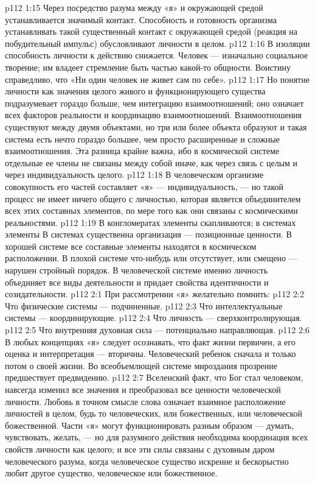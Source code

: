 \vs p112 1:15 Через посредство разума между «я» и окружающей средой устанавливается значимый контакт. Способность и готовность организма устанавливать такой существенный контакт с окружающей средой (реакция на побудительный импульс) обусловливают  личности в целом.
\vs p112 1:16 В изоляции способность личности к действию снижается. Человек --- изначально социальное творение; им владеет стремление быть частью какой\hyp{}то общности. Воистину справедливо, что «Ни один человек не живет сам по себе».
\vs p112 1:17 Но понятие личности как значения целого живого и функционирующего существа подразумевает гораздо больше, чем интеграцию взаимоотношений; оно означает  всех факторов реальности и координацию взаимоотношений. Взаимоотношения существуют между двумя объектами, но три или более объекта образуют  и такая система есть нечто гораздо большее, чем просто расширенные и сложные взаимоотношения. Эта разница крайне важна, ибо в космической системе отдельные ее члены не связаны между собой иначе, как через связь с целым и через индивидуальность целого.
\vs p112 1:18 В человеческом организме совокупность его частей составляет «я» --- индивидуальность, --- но такой процесс не имеет ничего общего с личностью, которая является объединителем всех этих составных элементов, по мере того как они связаны с космическими реальностями.
\vs p112 1:19 В конгломератах элементы скапливаются; в системах элементы  В системах существенна организация --- позиционные ценности. В хорошей системе все составные элементы находятся в космическом расположении. В плохой системе что\hyp{}нибудь или отсутствует, или смещено --- нарушен стройный порядок. В человеческой системе именно личность объединяет все виды деятельности и придает свойства идентичности и созидательности.
\vs p112 2:1 При рассмотрении «я» желательно помнить:
\vs p112 2:2 \bibnobreakspace Что физические системы --- подчиненные.
\vs p112 2:3 \bibnobreakspace Что интеллектуальные системы --- координирующие.
\vs p112 2:4 \bibnobreakspace Что личность --- сверхконтролирующая.
\vs p112 2:5 \bibnobreakspace Что внутренняя духовная сила --- потенциально направляющая.
\vs p112 2:6 \pc В любых концепциях «я» следует осознавать, что факт жизни первичен, а его оценка и интерпретация --- вторичны. Человеческий ребенок сначала  и только потом  о своей жизни. Во всеобъемлющей системе мироздания прозрение предшествует предвидению.
\vs p112 2:7 \pc Вселенский факт, что Бог стал человеком, навсегда изменил все значения и преобразовал все ценности человеческой личности. Любовь в точном смысле слова означает взаимное расположение личностей в целом, будь то человеческих, или божественных, или человеческой  божественной. Части «я» могут функционировать разным образом --- думать, чувствовать, желать, --- но для разумного действия необходима координация всех свойств личности как целого; и все эти силы связаны с духовным даром человеческого разума, когда человеческое существо искренне и бескорыстно любит другое существо, человеческое или божественное.
